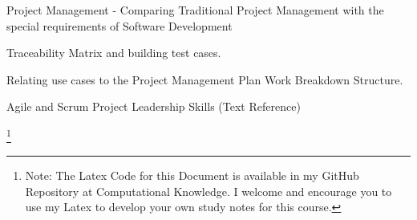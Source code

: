 \documentclass{article}
\begin{document}
\item Project Management - Comparing Traditional Project Management with the special requirements of Software Development
\item Traceability Matrix and building test cases.
\item Relating use cases to the Project Management Plan Work Breakdown Structure.
\item Agile and Scrum Project Leadership Skills (Text Reference)



\footnote{Note: The Latex Code for this Document is available in my GitHub Repository at 
    Computational Knowledge. I welcome and encourage you to use my Latex to develop your 
    own study notes for this course.}
 
\end{document}
